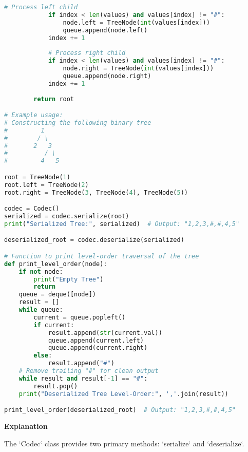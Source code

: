\begin{lstlisting}[language=Python, xleftmargin=0.02\textwidth, xrightmargin=0.02\textwidth]
            # Process left child
            if index < len(values) and values[index] != "#":
                node.left = TreeNode(int(values[index]))
                queue.append(node.left)
            index += 1
            
            # Process right child
            if index < len(values) and values[index] != "#":
                node.right = TreeNode(int(values[index]))
                queue.append(node.right)
            index += 1
        
        return root

# Example usage:
# Constructing the following binary tree
#         1
#        / \
#       2   3
#          / \
#         4   5

root = TreeNode(1)
root.left = TreeNode(2)
root.right = TreeNode(3, TreeNode(4), TreeNode(5))

codec = Codec()
serialized = codec.serialize(root)
print("Serialized Tree:", serialized)  # Output: "1,2,3,#,#,4,5"

deserialized_root = codec.deserialize(serialized)

# Function to print level-order traversal of the tree
def print_level_order(node):
    if not node:
        print("Empty Tree")
        return
    queue = deque([node])
    result = []
    while queue:
        current = queue.popleft()
        if current:
            result.append(str(current.val))
            queue.append(current.left)
            queue.append(current.right)
        else:
            result.append("#")
    # Remove trailing "#" for clean output
    while result and result[-1] == "#":
        result.pop()
    print("Deserialized Tree Level-Order:", ','.join(result))

print_level_order(deserialized_root)  # Output: "1,2,3,#,#,4,5"
\end{lstlisting}

\textbf{Explanation}

The `Codec` class provides two primary methods: `serialize` and `deserialize`. 

